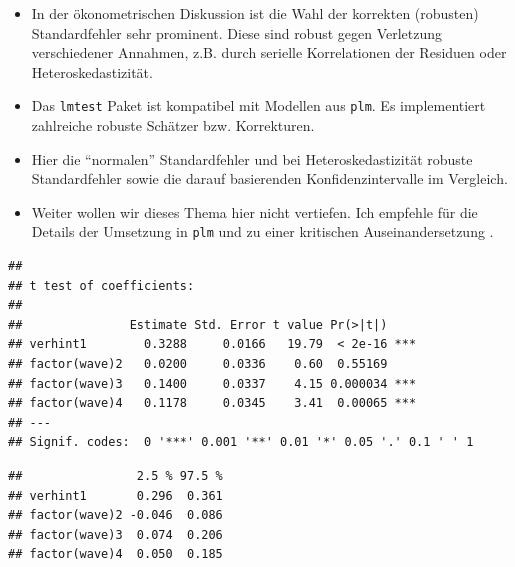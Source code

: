 \documentclass[
]{book}
\newenvironment{Shaded}{\begin{snugshade}}{\end{snugshade}}
\newcommand{\CommentTok}[1]{\textcolor[rgb]{0.56,0.35,0.01}{\textit{#1}}}
\newcommand{\KeywordTok}[1]{\textcolor[rgb]{0.13,0.29,0.53}{\textbf{#1}}}
\newcommand{\NormalTok}[1]{#1}
\newcommand{\OperatorTok}[1]{\textcolor[rgb]{0.81,0.36,0.00}{\textbf{#1}}}
\newcommand{\StringTok}[1]{\textcolor[rgb]{0.31,0.60,0.02}{#1}}
\begin{document}
\begin{itemize}
\item
  In der ökonometrischen Diskussion ist die Wahl der korrekten (robusten) Standardfehler sehr prominent. Diese sind robust gegen Verletzung verschiedener Annahmen, z.B. durch serielle Korrelationen der Residuen oder Heteroskedastizität.
\item
  Das \texttt{lmtest} Paket \citep{R-lmtest} ist kompatibel mit Modellen aus \texttt{plm}. Es implementiert zahlreiche robuste Schätzer bzw. Korrekturen.
\item
  Hier die ``normalen'' Standardfehler und bei Heteroskedastizität robuste Standardfehler sowie die darauf basierenden Konfidenzintervalle im Vergleich.
\item
  Weiter wollen wir dieses Thema hier nicht vertiefen. Ich empfehle für die Details der Umsetzung in \texttt{plm} \citet{plm2017} und zu einer kritischen Auseinandersetzung \citet{kingHowRobustStandard2015}.
\end{itemize}

\begin{Shaded}
\end{Shaded}

\begin{verbatim}
## 
## t test of coefficients:
## 
##               Estimate Std. Error t value Pr(>|t|)    
## verhint1        0.3288     0.0166   19.79  < 2e-16 ***
## factor(wave)2   0.0200     0.0336    0.60  0.55169    
## factor(wave)3   0.1400     0.0337    4.15 0.000034 ***
## factor(wave)4   0.1178     0.0345    3.41  0.00065 ***
## ---
## Signif. codes:  0 '***' 0.001 '**' 0.01 '*' 0.05 '.' 0.1 ' ' 1
\end{verbatim}

\begin{Shaded}
\end{Shaded}

\begin{verbatim}
##                2.5 % 97.5 %
## verhint1       0.296  0.361
## factor(wave)2 -0.046  0.086
## factor(wave)3  0.074  0.206
## factor(wave)4  0.050  0.185
\end{verbatim}
\end{document}

